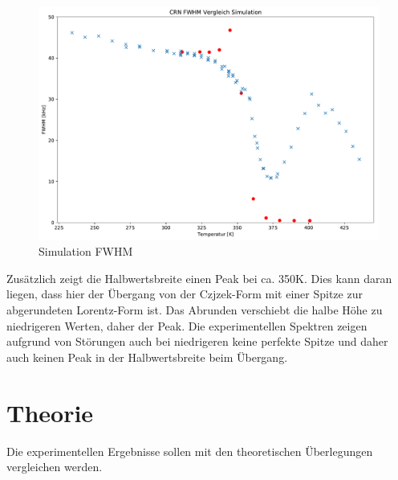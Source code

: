 \begin{figure}
	\begin{center}
		\includegraphics[width=\textwidth]{graphics/plots/SIM/sim_fwhm.pdf}
	\end{center}
	\caption{Simulation FWHM} \label{fig:res:sim_fwhm}
\end{figure}
Zusätzlich zeigt die Halbwertsbreite einen Peak bei ca. 350K. Dies kann daran liegen, dass hier der Übergang von der Czjzek-Form mit einer Spitze zur abgerundeten Lorentz-Form ist. Das Abrunden verschiebt die halbe Höhe zu niedrigeren Werten, daher der Peak. Die experimentellen Spektren zeigen aufgrund von Störungen auch bei niedrigeren keine perfekte Spitze und daher auch keinen Peak in der Halbwertsbreite beim Übergang.





\section{Theorie} \label{section:res:theorie}

Die experimentellen Ergebnisse sollen mit den theoretischen Überlegungen vergleichen werden.


